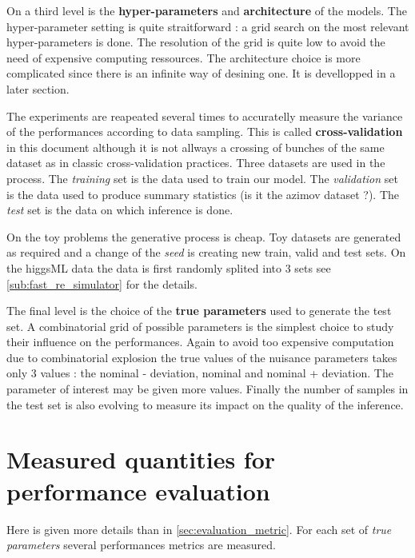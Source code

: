 On a third level is the \textbf{hyper-parameters} and \textbf{architecture} of the models.
The hyper-parameter setting is quite straitforward : a grid search on the most relevant hyper-parameters is done.
The resolution of the grid is quite low to avoid the need of expensive computing ressources.
The architecture choice is more complicated since there is an infinite way of desining one.
It is devellopped in a later section\needcite.

The experiments are reapeated several times to accuratelly measure the variance of the performances according to data sampling.
This is called \textbf{cross-validation} in this document although it is not allways a crossing of bunches of the same dataset as in classic cross-validation practices.
Three datasets are used in the process.
The \emph{training} set is the data used to train our model.
The \emph{validation} set is the data used to produce summary statistics (is it the azimov dataset ?).
The \emph{test} set is the data on which inference is done.

On the toy problems the generative process is cheap.
Toy datasets are generated as required and a change of the \emph{seed} is creating new train, valid and test sets.
On the higgsML data the data is first randomly splited into 3 sets see \autoref{sub:fast_re_simulator} for the details.

The final level is the choice of the \textbf{true parameters} used to generate the test set.
A combinatorial grid of possible parameters is the simplest choice to study their influence on the performances.
Again to avoid too expensive computation due to combinatorial explosion the true values of the nuisance parameters takes only 3 values :
the nominal - deviation, nominal and nominal + deviation.
The parameter of interest may be given more values.
Finally the number of samples in the test set is also evolving to measure its impact on the quality of the inference.



\section{Measured quantities for performance evaluation} %
\label{sec:measured_quantities_for_performance_evaluation}


Here is given more details than in \autoref{sec:evaluation_metric}.
For each set of \emph{true parameters} several performances metrics are measured.

